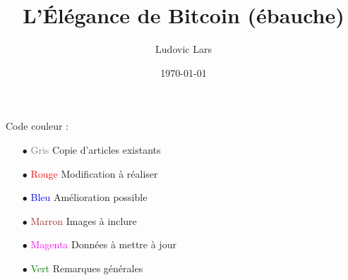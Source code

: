 \documentclass[a5paper]{book}
\title{L'Élégance de Bitcoin (ébauche)}     %
\author{Ludovic Lars}                       %
\date{\today}                               %
\begin{document}

\maketitle


\thispagestyle{empty} 
\doclicenseThis

% 

\mainmatter




















\newpage

Code couleur :

\begin{itemize}
\item[$\bullet$] \textcolor{gray}{Gris} Copie d'articles existants
\item[$\bullet$] \textcolor{red}{Rouge} Modification à réaliser
\item[$\bullet$] \textcolor{blue}{Bleu} Amélioration possible
\item[$\bullet$] \textcolor{brown}{Marron} Images à inclure
\item[$\bullet$] \textcolor{magenta}{Magenta} Données à mettre à jour
\item[$\bullet$] \textcolor{green}{Vert} Remarques générales
\end{itemize}
\end{document}
